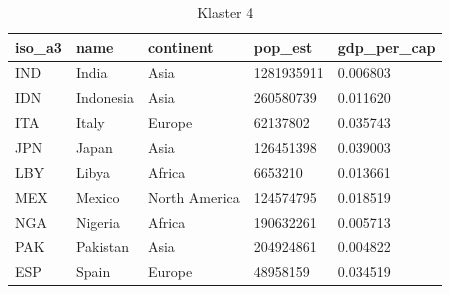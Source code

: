 \documentclass[11pt]{report}
\begin{document}
    \begin{table}[]
        \caption {Klaster 4} \label{tab:cl4}
        \begin{tabular}{lllll}
            \hline
            \multicolumn{1}{|l|}{iso\_a3} & \multicolumn{1}{l|}{name} & \multicolumn{1}{l|}{continent} & \multicolumn{1}{l|}{pop\_est} & \multicolumn{1}{l|}{gdp\_per\_cap} \\ \hline
            IND                           & India                     & Asia                           & 1281935911                    & 0.006803                           \\
            IDN                           & Indonesia                 & Asia                           & 260580739                     & 0.011620                           \\
            ITA                           & Italy                     & Europe                         & 62137802                      & 0.035743                           \\
            JPN                           & Japan                     & Asia                           & 126451398                     & 0.039003                           \\
            LBY                           & Libya                     & Africa                         & 6653210                       & 0.013661                           \\
            MEX                           & Mexico                    & North America                  & 124574795                     & 0.018519                           \\
            NGA                           & Nigeria                   & Africa                         & 190632261                     & 0.005713                           \\
            PAK                           & Pakistan                  & Asia                           & 204924861                     & 0.004822                           \\
            ESP                           & Spain                     & Europe                         & 48958159                      & 0.034519

        \end{tabular}
    \end{table}
\end{document}
